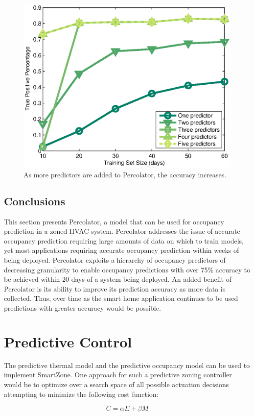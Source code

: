 \begin{figure}[!htb]
\begin{center}
\includegraphics[width=0.6\columnwidth]{fig/percolationDepth.eps}
\end{center}
\caption[Effect of percolation depth on accuracy]{As more predictors are added
to Percolator, the accuracy increases.}
\label{fig:percolationDepth}
\end{figure}

\subsection{Conclusions}
This section presents Percolator, a model that can be used for occupancy
prediction in a zoned HVAC system. Percolator addresses the issue of accurate
occupancy prediction requiring large amounts of data on which to train models,
yet most applications requiring accurate occupancy prediction within weeks of
being deployed. Percolator exploits a hierarchy of occupancy predictors of
decreasing granularity to enable occupancy predictions with over 75\% accuracy
to be achieved within 20 days of a system being deployed. An added benefit of
Percolator is its ability to improve its prediction accuracy as more data is
collected. Thus, over time as the smart home application continues to be used
predictions with greater accuracy would be possible.


\section{Predictive Control}
The predictive thermal model and the predictive occupancy model can be used to
implement SmartZone. One approach for such a predictive zoning controller would
be to optimize over a search space of all possible actuation decisions
attempting to minimize the following cost function:

\begin{equation}
\label{smartzoneCostFunction}
C = \alpha E + \beta M
\end{equation}

